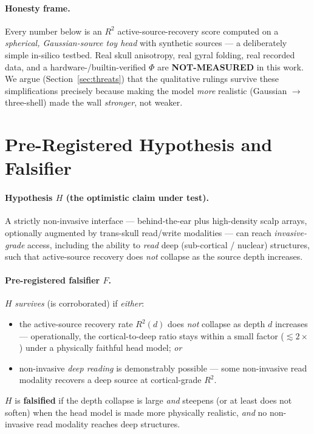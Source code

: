 \documentclass[11pt]{article}
\newcommand{\Rsq}{R^{2}}
\newcommand{\redbox}[1]{\textcolor{red!70!black}{\textbf{#1}}}
\begin{document}
\paragraph{Honesty frame.} Every number below is an $\Rsq$ active-source-recovery
score computed on a \emph{spherical, Gaussian-source toy head} with synthetic
sources --- a deliberately simple in-silico testbed. Real skull anisotropy, real
gyral folding, real recorded data, and a hardware-/builtin-verified $\Phi$ are
\textbf{NOT-MEASURED} in this work. We argue (Section~\ref{sec:threats}) that the
qualitative rulings survive these simplifications precisely because making the model
\emph{more} realistic (Gaussian $\rightarrow$ three-shell) made the wall
\emph{stronger}, not weaker.

\section{Pre-Registered Hypothesis and Falsifier}
\label{sec:hypothesis}

\paragraph{Hypothesis $H$ (the optimistic claim under test).}
A strictly non-invasive interface --- behind-the-ear plus high-density scalp arrays,
optionally augmented by trans-skull read/write modalities --- can reach
\emph{invasive-grade} access, including the ability to \emph{read} deep
(sub-cortical / nuclear) structures, such that active-source recovery does
\emph{not} collapse as the source depth increases.

\paragraph{Pre-registered falsifier $F$.} $H$ \emph{survives} (is corroborated) if
\emph{either}:
\begin{itemize}[leftmargin=2em]
  \item[\textbf{F1}] the active-source recovery rate $\Rsq(d)$ does \emph{not}
        collapse as depth $d$ increases --- operationally, the
        cortical-to-deep ratio stays within a small factor ($\lesssim 2\times$)
        under a physically faithful head model; \emph{or}
  \item[\textbf{F2}] non-invasive \emph{deep reading} is demonstrably possible ---
        some non-invasive read modality recovers a deep source at cortical-grade
        $\Rsq$.
\end{itemize}
$H$ is \redbox{falsified} if the depth collapse is large \emph{and} steepens (or at
least does not soften) when the head model is made more physically realistic,
\emph{and} no non-invasive read modality reaches deep structures.
\end{document}
